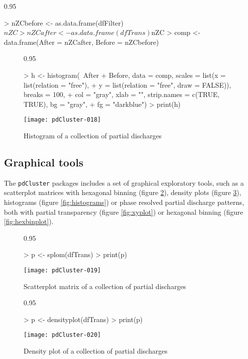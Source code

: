\documentclass{article}
\renewenvironment{Schunk}{\begin{center}
    \scriptsize
    \begin{boxedminipage}{0.95\textwidth}}{
    \end{boxedminipage}\end{center}}
\begin{document}
\begin{Schunk}
\begin{Sinput}
> nZCbefore <- as.data.frame(dfFilter)$nZC
> nZCafter <- as.data.frame(dfTrans)$nZC
> comp <- data.frame(After = nZCafter, Before = nZCbefore)
\end{Sinput}
\end{Schunk}

\begin{figure}
  \centering
\begin{Schunk}
\begin{Sinput}
> h <- histogram(~After + Before, data = comp, scales = list(x = list(relation = "free"), 
+     y = list(relation = "free", draw = FALSE)), breaks = 100, 
+     col = "gray", xlab = "", strip.names = c(TRUE, TRUE), bg = "gray", 
+     fg = "darkblue")
> print(h)
\end{Sinput}
\end{Schunk}
\texttt{[image: pdCluster-018]}
  \caption{Histogram of a collection of partial discharges}
  \label{fig:histogram}
\end{figure}

\subsection{Graphical tools}
\label{sec:graphics}

The \texttt{pdCluster} packages includes a set of graphical
exploratory tools, such as a scatterplot matrices with hexagonal
binning \cite{Carr.Littlefield.ea1987} (figure \ref{fig:splom}), density plots (figure
\ref{fig:density}), histograms (figure \ref{fig:histograms}) or phase
resolved partial discharge patterns, both with partial transparency
(figure \ref{fig:xyplot}) or hexagonal binning (figure
\ref{fig:hexbinplot}).

\begin{figure}
  \centering
\begin{Schunk}
\begin{Sinput}
> p <- splom(dfTrans)
> print(p)
\end{Sinput}
\end{Schunk}
\texttt{[image: pdCluster-019]}
  \caption{Scatterplot matrix of a collection of partial discharges}
  \label{fig:splom}
\end{figure}

\begin{figure}
  \centering
\begin{Schunk}
\begin{Sinput}
> p <- densityplot(dfTrans)
> print(p)
\end{Sinput}
\end{Schunk}
\texttt{[image: pdCluster-020]}
  \caption{Density plot of a collection of partial discharges}
  \label{fig:density}
\end{figure}
\end{document}
